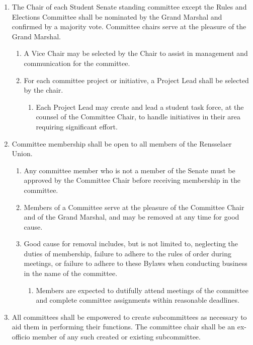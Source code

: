 \begin{enumerate}

\item The Chair of each Student Senate standing committee except the Rules and Elections Committee shall be nominated by the
Grand Marshal and confirmed by a majority vote. Committee chairs serve at the pleasure of the Grand Marshal.
\begin{enumerate}
\item A Vice Chair may be selected by the Chair to assist in management and communication for the committee.
\item For each committee project or initiative, a Project Lead shall be selected by the chair.
\begin{enumerate}
\item Each Project Lead may create and lead a student task force, at the counsel of the Committee Chair, to handle initiatives
in their area requiring significant effort.
\end{enumerate}
\end{enumerate}

\item Committee membership shall be open to all members of the Rensselaer Union.
\begin{enumerate}
\item Any committee member who is not a member of the Senate must be approved by the Committee Chair before receiving
membership in the committee.
\item Members of a Committee serve at the pleasure of the Committee Chair and of the Grand Marshal, and may be removed at
any time for good cause.
\item Good cause for removal includes, but is not limited to, neglecting the duties of membership, failure to adhere to the rules of
order during meetings, or failure to adhere to these Bylaws when conducting business in the name of the committee.
\begin{enumerate}
\item Members are expected to dutifully attend meetings of the committee and complete committee assignments within reasonable deadlines.
\end{enumerate}
\end{enumerate}

\item All committees shall be empowered to create subcommittees as necessary to aid them in performing their functions. The
committee chair shall be an ex-officio member of any such created or existing subcommittee.


\end{enumerate}
